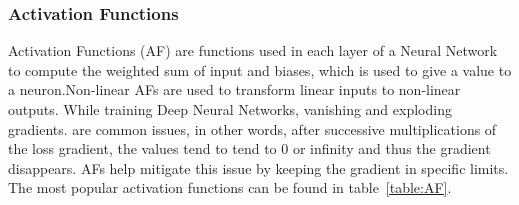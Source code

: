 \subsubsection{Activation Functions}

\quad Activation Functions (AF) are functions used in each layer of a Neural Network to compute the weighted sum of input and biases,
which is used to give a value to a neuron.Non-linear AFs are used to transform linear inputs to non-linear outputs.
 While training Deep Neural Networks, vanishing and exploding gradients.
are common issues, in other words, after successive multiplications of the loss gradient, the values tend to tend to 0 or infinity and thus the gradient disappears.
AFs help mitigate this issue by keeping the gradient in specific limits. The most popular activation functions can be found in table~\ref{table:AF}.



\begin{table}[]
    \centering
    \resizebox{.6\textwidth}{!}{%
    \begin{tabular}{ll}
    \hline
    \textbf{Activation Functions} & \textbf{Computation Equation} \\ \hline \hline
    Sigmoid                       &  $\displaystyle f(x)=\frac{1}{1+ e^{-x}}$                             \\ \hline
    Tanh                          &  $\displaystyle f(x)=\frac{e^{x}-e^{-x}}{e^{x}+e^{-x}}$                            \\ \hline
    Softmax                       &  $\displaystyle f(x_{i})=\frac{x_{i}}{\sum_{j}e^{x_{j}}}$                             \\ \hline
    ReLU                          &    $ f(x)=\begin{matrix}
        x & if & x\geq 0  \\ 
        0 & if & x< 0 
    \end{matrix} $                           \\ \hline
    LReLU                         &  $f(x)= \begin{matrix}
        x & if & x > 0  \\ 
        \alpha x & if & x \leq 0 
    \end{matrix} $                        \\ \hline
    ELU                           &             $ f(x)=\begin{matrix}
        x & if & x> 0  \\ 
        \alpha e^{x} - 1 & if & x\leq 0 
    \end{matrix} $                 \\ \hline
    \end{tabular}%
    }
    \caption{Popular Activation functions}
    \label{table:AF}
\end{table}


